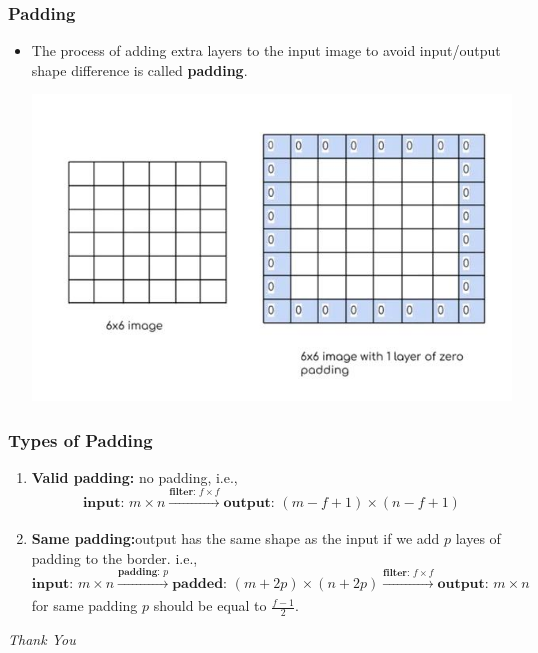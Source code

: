 \documentclass[12pt,aspectratio=169]{beamer}
\begin{document}
\begin{frame}
\frametitle{Padding}
\begin{itemize}
\item The process of adding extra layers to the input image to avoid input/output shape difference is called \textbf{padding}.\pause
\begin{center}
\includegraphics[scale=0.6]{padding}
\end{center}
\end{itemize}
\end{frame}

\begin{frame}
\frametitle{Types of Padding}
\begin{enumerate}
\item \textbf{Valid padding:} no padding, i.e.,
\[
\textbf{input: }m\times n \xrightarrow[]{\textbf{filter: } f\times f} \textbf{output: }(m-f+1)\times (n-f+1)
\]\pause
\item \textbf{Same padding:}output has the same shape as the input if we add $p$ layes of padding to the border. i.e.,\pause
\[
\textbf{input: }m\times n \xrightarrow[]{\textbf{padding: }p}\textbf{padded: }(m+2p)\times (n+2p) \xrightarrow[]{\textbf{filter: } f\times f} \textbf{output: }m\times n
\]\pause
for same padding $p$ should be equal to $\frac{f-1}{2}$.
\end{enumerate}
\end{frame}



\begin{frame}
\begin{center}
\end{center}
\end{frame}

\begin{frame}{}
  \centering \Huge
  \emph{Thank You}
\end{frame}
\end{document}
